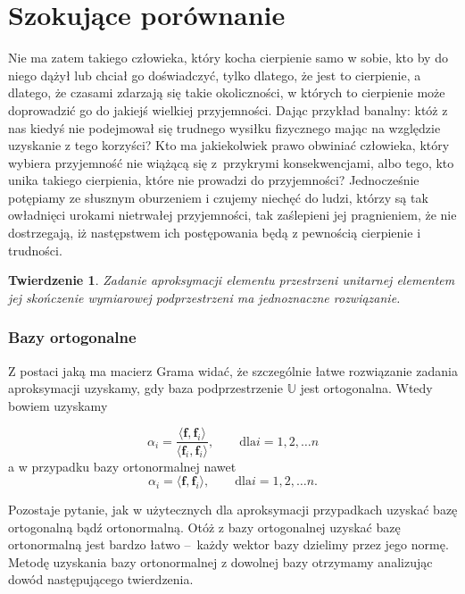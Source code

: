\documentclass[12pt]{mwbk}
\theoremstyle{plain}
\newtheorem{twier}{Twierdzenie}[chapter] %
\theoremstyle{definition}
\theoremstyle{remark}
\newcommand{\ff}{\mathbf{f}}
\newcommand{\skalar}[2]{\pmb{\langle}#1,#2\pmb{\rangle}}
\begin{document}
\section{Szokujące porównanie}
Nie ma zatem takiego człowieka, który kocha cierpienie samo w sobie, 
kto by do niego dążył lub chciał go doświadczyć, tylko dlatego, że
jest to cierpienie, a dlatego, że czasami zdarzają się takie 
okoliczności, w których to cierpienie może doprowadzić 
go do jakiejś wielkiej przyjemności. 
Dając przykład banalny: któż z nas kiedyś nie podejmował 
się trudnego wysiłku fizycznego mając na względzie 
uzyskanie z tego korzyści? 
Kto ma jakiekolwiek prawo obwiniać człowieka, 
który wybiera przyjemność nie wiążącą się z~przykrymi 
konsekwencjami, albo tego, kto unika takiego cierpienia, 
które nie prowadzi do przyjemności? 
Jednocześnie potępiamy ze słusznym oburzeniem i czujemy 
niechęć do ludzi, którzy są tak owładnięci urokami nietrwałej 
przyjemności, tak zaślepieni jej pragnieniem, 
że nie dostrzegają, iż następstwem ich 
postępowania będą z pewnością cierpienie i trudności.

\begin{twier}
	Zadanie aproksymacji elementu przestrzeni unitarnej elementem
	jej skończenie wymiarowej podprzestrzeni ma jednoznaczne
	rozwiązanie.
\end{twier}

\subsubsection{Bazy ortogonalne}
Z postaci jaką ma macierz Grama widać, że szczególnie łatwe rozwiązanie zadania
aproksymacji uzyskamy, gdy baza podprzestrzenie $\mathbb{U}$ jest ortogonalna.
Wtedy bowiem uzyskamy


\[
\alpha_i=\frac{\skalar{\ff}{\ff_i}}{\skalar{\ff_i}{\ff_i}},\qquad\text{dla
$i=1,2,\ldots n$}
\]
a w przypadku bazy ortonormalnej nawet
\[
\alpha_i=\skalar{\ff}{\ff_i},\qquad\text{dla
$i=1,2,\ldots n$.}
\]


Pozostaje pytanie, jak w użytecznych dla aproksymacji przypadkach uzyskać bazę
ortogonalną bądź ortonormalną. Otóż z bazy ortogonalnej uzyskać bazę
ortonormalną jest bardzo łatwo --~każdy wektor bazy dzielimy przez
jego normę. Metodę uzyskania bazy ortonormalnej z dowolnej bazy
otrzymamy analizując dowód następującego twierdzenia.
\end{document}
